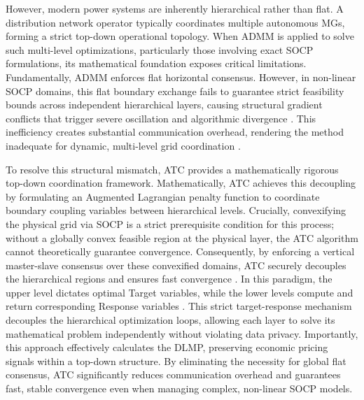 However, modern power systems are inherently hierarchical rather than flat. A distribution network operator typically coordinates multiple autonomous MGs, forming a strict top-down operational topology. When ADMM is applied to solve such multi-level optimizations, particularly those involving exact SOCP formulations, its mathematical foundation exposes critical limitations. Fundamentally, ADMM enforces flat horizontal consensus. However, in non-linear SOCP domains, this flat boundary exchange fails to guarantee strict feasibility bounds across independent hierarchical layers, causing structural gradient conflicts that trigger severe oscillation and algorithmic divergence \cite{Rajaei2021}. This inefficiency creates substantial communication overhead, rendering the method inadequate for dynamic, multi-level grid coordination \cite{Sun_2022}.

To resolve this structural mismatch, ATC provides a mathematically rigorous top-down coordination framework. Mathematically, ATC achieves this decoupling by formulating an Augmented Lagrangian penalty function to coordinate boundary coupling variables between hierarchical levels. Crucially, convexifying the physical grid via SOCP is a strict prerequisite condition for this process; without a globally convex feasible region at the physical layer, the ATC algorithm cannot theoretically guarantee convergence. Consequently, by enforcing a vertical master-slave consensus over these convexified domains, ATC securely decouples the hierarchical regions and ensures fast convergence \cite{mohammadi2020accelerated}. In this paradigm, the upper level dictates optimal Target variables, while the lower levels compute and return corresponding Response variables \cite{Zhao2022_ATC, Kong2020_ATC}. This strict target-response mechanism decouples the hierarchical optimization loops, allowing each layer to solve its mathematical problem independently without violating data privacy. Importantly, this approach effectively calculates the DLMP, preserving economic pricing signals within a top-down structure. By eliminating the necessity for global flat consensus, ATC significantly reduces communication overhead and guarantees fast, stable convergence even when managing complex, non-linear SOCP models.

